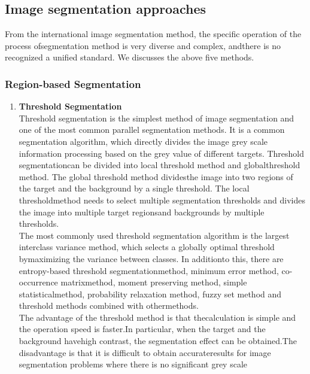 \subsection{Image segmentation approaches}
From the international image segmentation method, the specific operation of the process ofsegmentation method is very 
diverse and complex, andthere is no recognized a unified standard. We discusses the above five methods.
\subsubsection{Region-based Segmentation}
        \begin{enumerate}[label=(\alph*)]
                \item \textbf{Threshold Segmentation}\\
                Threshold segmentation is the simplest method of image segmentation and one of the
                most common parallel segmentation methods. It is a common segmentation algorithm,
                which directly divides the image grey scale information processing based on the grey
                value of different targets. Threshold segmentationcan be divided into local threshold
                method and globalthreshold method. The global threshold method dividesthe image into
                two regions of the target and the background by a single threshold. The local thresholdmethod
                needs to select multiple segmentation thresholds and divides the image into multiple target
                regionsand backgrounds by multiple thresholds.\\
                The most commonly used threshold segmentation algorithm is the largest interclass variance method,
                which selects a globally optimal threshold bymaximizing the variance between classes.
                In additionto this, there are entropy-based threshold segmentationmethod, minimum error method,
                co-occurrence matrixmethod, moment preserving method, simple statisticalmethod, probability
                relaxation method, fuzzy set method and threshold methods combined with othermethods.\\
                The advantage of the threshold method is that thecalculation is simple and the operation
                speed is faster.In particular, when the target and the background havehigh contrast,
                the segmentation effect can be obtained.The disadvantage is that it is difficult to obtain
                accurateresults for image segmentation problems where there is no significant grey scale

\end{enumerate}
